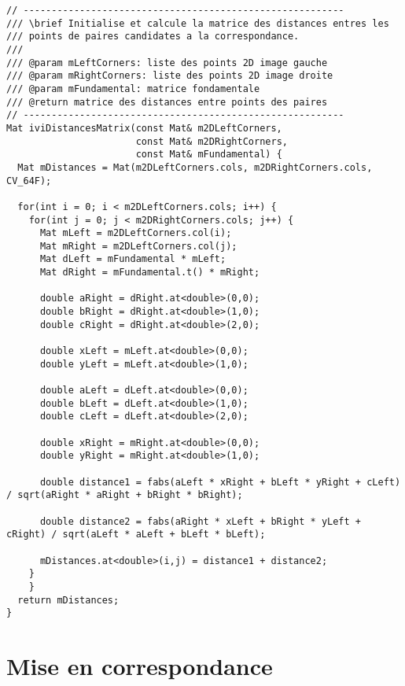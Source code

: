 \documentclass[a4paper]{article}
\begin{document}
\begin{lstlisting}
// ---------------------------------------------------------
/// \brief Initialise et calcule la matrice des distances entres les
/// points de paires candidates a la correspondance.
///
/// @param mLeftCorners: liste des points 2D image gauche
/// @param mRightCorners: liste des points 2D image droite
/// @param mFundamental: matrice fondamentale
/// @return matrice des distances entre points des paires
// ---------------------------------------------------------
Mat iviDistancesMatrix(const Mat& m2DLeftCorners,
                       const Mat& m2DRightCorners,
                       const Mat& mFundamental) {
  Mat mDistances = Mat(m2DLeftCorners.cols, m2DRightCorners.cols, CV_64F);

  for(int i = 0; i < m2DLeftCorners.cols; i++) {
    for(int j = 0; j < m2DRightCorners.cols; j++) {
      Mat mLeft = m2DLeftCorners.col(i);
      Mat mRight = m2DLeftCorners.col(j);
      Mat dLeft = mFundamental * mLeft;
      Mat dRight = mFundamental.t() * mRight;

      double aRight = dRight.at<double>(0,0);
      double bRight = dRight.at<double>(1,0);
      double cRight = dRight.at<double>(2,0);

      double xLeft = mLeft.at<double>(0,0);
      double yLeft = mLeft.at<double>(1,0);

      double aLeft = dLeft.at<double>(0,0);
      double bLeft = dLeft.at<double>(1,0);
      double cLeft = dLeft.at<double>(2,0);

      double xRight = mRight.at<double>(0,0);
      double yRight = mRight.at<double>(1,0);

      double distance1 = fabs(aLeft * xRight + bLeft * yRight + cLeft) / sqrt(aRight * aRight + bRight * bRight);

      double distance2 = fabs(aRight * xLeft + bRight * yLeft + cRight) / sqrt(aLeft * aLeft + bLeft * bLeft);

      mDistances.at<double>(i,j) = distance1 + distance2;
    }
    }
  return mDistances;
}
\end{lstlisting}

\clearpage

\section{Mise en correspondance}
\end{document}
